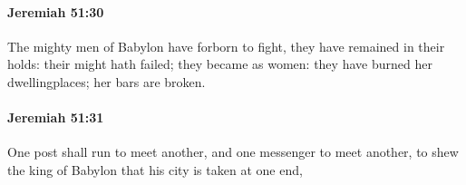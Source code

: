 		\paragraph{Jeremiah 51:30} %
			\label{JEREMIAH-51-30}

			The mighty men of Babylon have forborn to fight, they have remained in their holds: their might hath failed; they became as women: they have burned her dwellingplaces; her bars are broken.


		\paragraph{Jeremiah 51:31} %
			\label{JEREMIAH-51-31}

			One post shall run to meet another, and one messenger to meet another, to shew the king of Babylon that his city is taken at one end,



